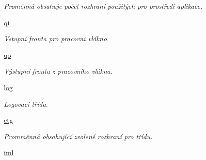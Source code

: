 \begin{DoxyCompactItemize}
\begin{DoxyCompactList}\small\item\em Proměnná obsahuje počet rozhraní použitých pro prostředí aplikace. \end{DoxyCompactList}\item 
\hypertarget{classcloseSetup_1_1App_ad94e177d0372d391443a7441da20de8b}{\hyperlink{classcloseSetup_1_1App_ad94e177d0372d391443a7441da20de8b}{qi}}\label{df/df9/classcloseSetup_1_1App_ad94e177d0372d391443a7441da20de8b}

\begin{DoxyCompactList}\small\item\em Vstupní fronta pro pracovní vlákno. \end{DoxyCompactList}\item 
\hypertarget{classcloseSetup_1_1App_afece39b57a288035a847c0c3590e393a}{\hyperlink{classcloseSetup_1_1App_afece39b57a288035a847c0c3590e393a}{qo}}\label{df/df9/classcloseSetup_1_1App_afece39b57a288035a847c0c3590e393a}

\begin{DoxyCompactList}\small\item\em Výstupní fronta z pracovního vlákna. \end{DoxyCompactList}\item 
\hypertarget{classcloseSetup_1_1App_a8147f5fac97abc783c832707ca0adb56}{\hyperlink{classcloseSetup_1_1App_a8147f5fac97abc783c832707ca0adb56}{log}}\label{df/df9/classcloseSetup_1_1App_a8147f5fac97abc783c832707ca0adb56}

\begin{DoxyCompactList}\small\item\em Logovací třída. \end{DoxyCompactList}\item 
\hypertarget{classcloseSetup_1_1App_a24826e8679eaa9d1866df9e1172dc716}{\hyperlink{classcloseSetup_1_1App_a24826e8679eaa9d1866df9e1172dc716}{etg}}\label{df/df9/classcloseSetup_1_1App_a24826e8679eaa9d1866df9e1172dc716}

\begin{DoxyCompactList}\small\item\em Promměnná obsahující zvolené rozhraní pro třídu. \end{DoxyCompactList}\item 
\hypertarget{classcloseSetup_1_1App_a1f906c533c8fd3e9352eed11b43b86d9}{\hyperlink{classcloseSetup_1_1App_a1f906c533c8fd3e9352eed11b43b86d9}{iml}}\label{df/df9/classcloseSetup_1_1App_a1f906c533c8fd3e9352eed11b43b86d9}


\end{DoxyCompactItemize}
